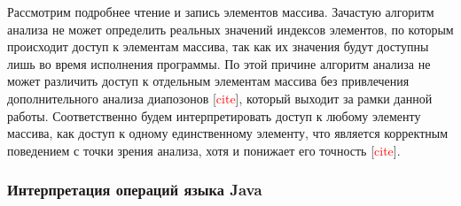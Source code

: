 \documentclass[14pt,titlepage]{extarticle}
\newcommand{\todocite}{[\textcolor{red}{\eng{cite}}]}
\newcommand{\eng}[1]{{\English#1}}
\begin{document}
      Рассмотрим подробнее чтение и запись элементов массива. Зачастую
      алгоритм анализа не может определить реальных значений индексов
      элементов, по которым происходит доступ к элементам массива, так как их
      значения будут доступны лишь во время исполнения программы.
      По этой причине алгоритм анализа не может различить доступ к отдельным
      элементам массива без привлечения дополнительного анализа диапозонов
      \todocite, который выходит за рамки данной работы.
      Соответственно будем интерпретировать доступ к любому элементу массива,
      как доступ к одному единственному элементу, что является корректным
      поведением с точки зрения анализа, хотя и понижает его точность
      \todocite.

      \subsubsection{Интерпретация операций языка Java}
\end{document}
